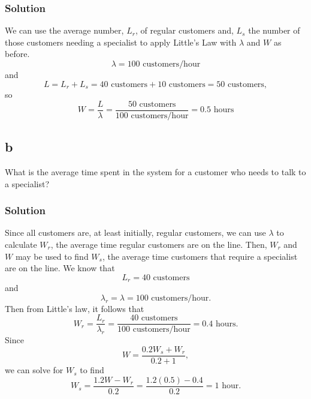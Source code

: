 \documentclass[letterpaper]{amsart}
\begin{document}
\subsubsection*{Solution}
We can use the average number, $L_r$, of regular customers and, $L_s$ the number of those
customers needing a specialist to apply Little's Law with $\lambda$ and $W$ as before.
\begin{equation}
  \lambda = 100\text{ customers/hour}
\end{equation}
and
\begin{equation}
  L = L_r + L_s = 40\text{ customers}+10\text{ customers}=50\text{ customers},
\end{equation}
so
\begin{equation}
  W = \frac{L}{\lambda} =\frac{50\text{ customers}}{100\text{ customers/hour}}=0.5\text{ hours}
\end{equation}
\subsection*{b}
What is the average time spent in the system for a customer who needs to talk to
a specialist?
\subsubsection*{Solution}
Since all customers are, at least initially, regular customers, we can
use $\lambda$ to calculate $W_r$, the average time regular customers are on the
line. Then, $W_r$ and $W$ may be used to find $W_s$, the average time customers
that require a specialist are on the line. We know that
\begin{equation}
  L_r = 40\text{ customers}
\end{equation}
and
\begin{equation}
  \lambda_r = \lambda = 100 \text{ customers/hour}.
\end{equation}
Then from Little's law, it follows that
\begin{equation}
  W_r= \frac{L_r}{\lambda_r} =\frac{40\text{ customers}}{100\text{ customers/hour}}
        =0.4\text{ hours}.
\end{equation}
Since
\begin{equation}
  W = \frac{0.2W_s + W_r}{0.2+1},
\end{equation}
we can solve for $W_s$ to find
\begin{equation}
  W_s = \frac{1.2W-W_r}{0.2} = \frac{1.2(0.5)-0.4}{0.2} = 1\text{ hour}.
\end{equation}
\end{document}
